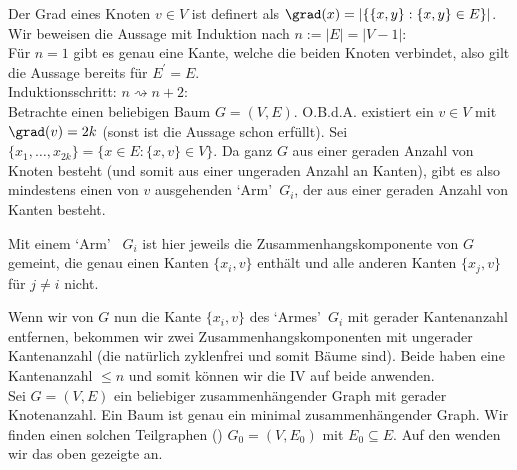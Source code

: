
\begin{solution}

Der Grad eines Knoten $v \in V$
ist definert als $\grad(x) = |\{\{x, y\}: \{x, y\} \in E\}|$. \\
Wir beweisen die Aussage mit Induktion nach $n := |E| = |V-1|$: \\

Für $n = 1$ gibt es genau eine Kante, welche die beiden Knoten verbindet, 
also gilt die Aussage bereits für $E^\prime = E$. \\

Induktionsschritt: $n \rightsquigarrow n + 2$: \\
Betrachte einen beliebigen Baum $G = (V, E)$.
O.B.d.A. existiert ein $v \in V$ mit $\grad(v) = 2k$ (sonst ist die Aussage schon erfüllt). Sei $\{x_1, \dots, x_{2k}\} = \{x \in E: \{x, v \} \in V\}$.
Da ganz $G$ aus einer geraden Anzahl von Knoten besteht (und somit aus einer ungeraden Anzahl an Kanten), gibt es also mindestens einen von $v$ ausgehenden \textquoteleft{Arm}\textquoteright ~$G_i$, der aus einer geraden Anzahl von Kanten besteht.

Mit einem \textquoteleft{Arm}\textquoteright ~ $G_i$ ist hier jeweils die Zusammenhangskomponente von $G$ gemeint, die genau einen Kanten $\{x_i, v\}$ enthält und alle anderen Kanten $\{x_j, v\}$ für $j \neq i$ nicht.

Wenn wir von $G$ nun die Kante $\{x_i, v\}$ des \textquoteleft{Armes}\textquoteright ~$G_i$ mit gerader Kantenanzahl entfernen, bekommen wir zwei Zusammenhangskomponenten mit ungerader Kantenanzahl (die natürlich zyklenfrei und somit Bäume sind). Beide haben eine Kantenanzahl $\leq n$ und somit können wir die IV auf beide anwenden. \\

Sei $G = (V, E)$ ein beliebiger zusammenhängender Graph mit gerader Knotenanzahl.
Ein Baum ist genau ein minimal zusammenhängender Graph.
Wir finden einen solchen Teilgraphen () $G_0 = (V, E_0)$ mit $E_0 \subseteq E$.
Auf den wenden wir das oben gezeigte an.

\end{solution}

